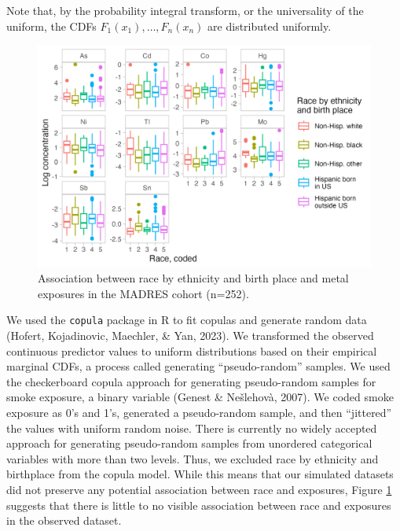 \documentclass[12pt, twoside]{amherstthesis}
\begin{document}
\noindent Note that, by the probability integral transform, or the universality of the uniform, the CDFs \(F_1(x_1), \dots, F_n(x_n)\) are distributed uniformly.
\begin{figure}

{\centering \includegraphics[width=0.75\linewidth]{figures/ch4_race_exp} 

}

\caption{Association between race by ethnicity and birth place and metal exposures in the MADRES cohort (n=252).}\label{fig:raceexp}
\end{figure}
We used the \texttt{copula} package in R to fit copulas and generate random data (Hofert, Kojadinovic, Maechler, \& Yan, 2023). We transformed the observed continuous predictor values to uniform distributions based on their empirical marginal CDFs, a process called generating ``pseudo-random'' samples. We used the checkerboard copula approach for generating pseudo-random samples for smoke exposure, a binary variable (Genest \& Nešlehovà, 2007). We coded smoke exposure as 0's and 1's, generated a pseudo-random sample, and then ``jittered'' the values with uniform random noise. There is currently no widely accepted approach for generating pseudo-random samples from unordered categorical variables with more than two levels. Thus, we excluded race by ethnicity and birthplace from the copula model. While this means that our simulated datasets did not preserve any potential association between race and exposures, Figure \ref{fig:raceexp} suggests that there is little to no visible association between race and exposures in the observed dataset.
\end{document}
